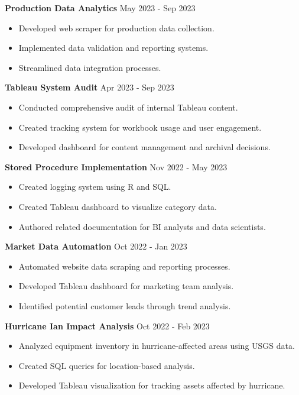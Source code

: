 \documentclass[a4paper,10pt]{article}
\begin{document}
\textbf{Production Data Analytics} \hfill May 2023 - Sep 2023
\begin{itemize}[noitemsep, topsep=0pt]
    \item Developed web scraper for production data collection.
    \item Implemented data validation and reporting systems.
    \item Streamlined data integration processes.
\end{itemize}
\textbf{Tableau System Audit} \hfill Apr 2023 - Sep 2023
\begin{itemize}[noitemsep, topsep=0pt]
    \item Conducted comprehensive audit of internal Tableau content.
    \item Created tracking system for workbook usage and user engagement.
    \item Developed dashboard for content management and archival decisions.
\end{itemize}
\textbf{Stored Procedure Implementation} \hfill Nov 2022 - May 2023
\begin{itemize}[noitemsep, topsep=0pt]
    \item Created logging system using R and SQL.
    \item Created Tableau dashboard to visualize category data.
    \item Authored related documentation for BI analysts and data scientists.
\end{itemize}
\textbf{Market Data Automation} \hfill Oct 2022 - Jan 2023
\begin{itemize}[noitemsep, topsep=0pt]
    \item Automated website data scraping and reporting processes.
    \item Developed Tableau dashboard for marketing team analysis.
    \item Identified potential customer leads through trend analysis.
\end{itemize}
\textbf{Hurricane Ian Impact Analysis} \hfill Oct 2022 - Feb 2023
\begin{itemize}[noitemsep, topsep=0pt]
    \item Analyzed equipment inventory in hurricane-affected areas using USGS data.
    \item Created SQL queries for location-based analysis.
    \item Developed Tableau visualization for tracking assets affected by hurricane.
\end{itemize}
\end{document}
